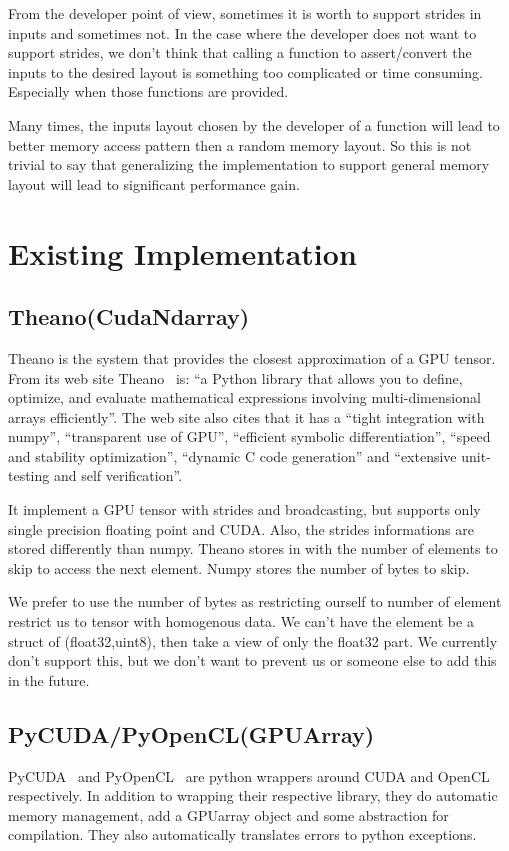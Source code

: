 \documentclass{article} %
\begin{document}
From the developer point of view, sometimes it is worth to support
strides in inputs and sometimes not.  In the case where the developer does not want to support strides, we don't think
that calling a function to assert/convert the inputs to the desired layout is something too complicated or time consuming.
Especially when those functions are provided.

Many times, the inputs layout chosen by the developer of a function
will lead to better memory access pattern then a random memory
layout. So this is not trivial to say that generalizing the
implementation to support general memory layout will lead to
significant performance gain. 

\section{Existing Implementation}
\subsection{Theano(CudaNdarray)}
Theano is the system that provides the closest approximation of a GPU tensor. From its web site Theano~\citep{bergstra+al:2010-scipy} is:
``a Python library that allows you to define, optimize, and evaluate mathematical expressions involving multi-dimensional arrays efficiently''. The web site also cites that it has a ``tight integration with numpy'', ``transparent use of GPU'', ``efficient symbolic differentiation'', ``speed and stability optimization'', ``dynamic C code generation'' and ``extensive unit-testing and self verification''.

It implement a GPU tensor with strides and broadcasting, but supports only single precision floating point and CUDA. Also, the strides informations are stored differently than numpy. Theano stores in with the number of elements to skip to access the next element. Numpy stores the number of bytes to skip.

We prefer to use the number of bytes as restricting ourself to number of element restrict us to tensor with homogenous data. We can't have the element be a struct of (float32,uint8), then take a view of only the float32 part. We currently don't support this, but we don't want to prevent us or someone else to add this in the future.

\subsection{PyCUDA/PyOpenCL(GPUArray)}
PyCUDA~\citep{kloeckner_pycuda_2009} and PyOpenCL~\citep{kloeckner_pycuda_2009} are python wrappers around CUDA and OpenCL respectively. In addition to wrapping their respective library, they do automatic memory management, add a GPUarray object and some abstraction for compilation. They also automatically translates errors to python exceptions.
\end{document}
